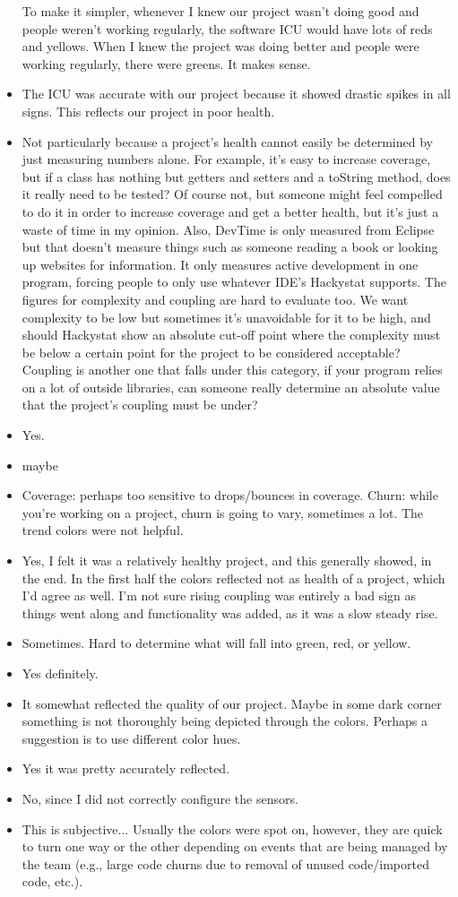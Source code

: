 \begin{itemize}
To make it simpler, whenever I knew our project wasn't doing good and people weren't working regularly, the software ICU would have lots of reds and yellows. When I knew the project was doing better and people were working regularly, there were greens. It makes sense.
\item The ICU was accurate with our project because it showed drastic spikes in all signs.  This reflects our project in poor health.
\item Not particularly because a project's health cannot easily be determined by just measuring numbers alone. For example, it's easy to increase coverage, but if a class has nothing but getters and setters and a toString method, does it really need to be tested? Of course not, but someone might feel compelled to do it in order to increase coverage and get a better health, but it's just a waste of time in my opinion. Also, DevTime is only measured from Eclipse but that doesn't measure things such as someone reading a book or looking up websites for information. It only measures active development in one program, forcing people to only use whatever IDE's Hackystat supports. The figures for complexity and coupling are hard to evaluate too. We want complexity to be low but sometimes it's unavoidable for it to be high, and should Hackystat show an absolute cut-off point where the complexity must be below a certain point for the project to be considered acceptable? Coupling is another one that falls under this category, if your program relies on a lot of outside libraries, can someone really determine an absolute value that the project's coupling must be under?
\item Yes.
\item maybe
\item Coverage: perhaps too sensitive to drops/bounces in coverage.
Churn: while you're working on a project, churn is going to vary, sometimes a lot.  The trend colors were not helpful.
\item Yes, I felt it was a relatively healthy project, and this generally showed, in the end.  In the first half the colors reflected not as health of a project, which I'd agree as well.  I'm not sure rising coupling was entirely a bad sign as things went along and functionality was added, as it was a slow steady rise.
\item Sometimes.  Hard to determine what will fall into green, red, or yellow.
\item Yes definitely.
\item It somewhat reflected the quality of our project. Maybe in some dark corner something is not thoroughly being depicted through the colors. Perhaps a suggestion is to use different color hues.
\item Yes it was pretty accurately reflected.
\item No, since I did not correctly configure the sensors.
\item This is subjective...  Usually the colors were spot on, however, they are quick to turn one way or the other depending on events that are being managed by the team (e.g., large code churns due to removal of unused code/imported code, etc.).
\end{itemize}

